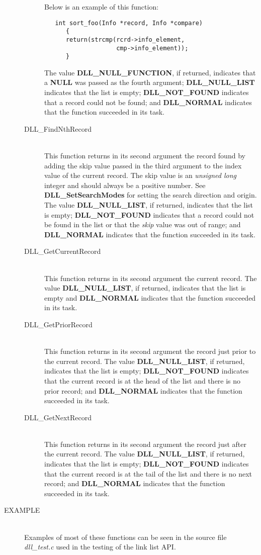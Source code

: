 \documentclass[10pt,letterpaper,titlepage]{article}
\begin{document}
\begin{description}
\begin{description}
 Below is an example of this function:

\begin{verbatim}
   int sort_foo(Info *record, Info *compare)
      {
      return(strcmp(rcrd->info_element,
                    cmp->info_element));
      }
\end{verbatim}

  The value \textbf{DLL\_NULL\_FUNCTION}, if returned, indicates that a \textbf{NULL} was passed as the fourth argument; \textbf{DLL\_NULL\_LIST} indicates that the list is empty; \textbf{DLL\_NOT\_FOUND} indicates that a record could not be found; and \textbf{DLL\_NORMAL} indicates that the function succeeded in its task.

\item[DLL\_FindNthRecord]\quad\\
 This function returns in its second argument the record found by adding the skip value passed in the third argument to the index value of the current record.  The skip value is an \emph{unsigned long} integer and should always be a positive number.  See \textbf{DLL\_SetSearchModes} for setting the search direction and origin.  The value \textbf{DLL\_NULL\_LIST}, if returned, indicates that the list is empty; \textbf{DLL\_NOT\_FOUND} indicates that a record could not be found in the list or that the \emph{skip} value was out of range; and \textbf{DLL\_NORMAL} indicates that the function succeeded in its task.

\item[DLL\_GetCurrentRecord]\quad\\
 This function returns in its second argument the current record.  The value \textbf{DLL\_NULL\_LIST}, if returned, indicates that the list is empty and \textbf{DLL\_NORMAL} indicates that the function succeeded in its task.

\item[DLL\_GetPriorRecord]\quad\\
 This function returns in its second argument the record just prior to the current record.  The value \textbf{DLL\_NULL\_LIST}, if returned, indicates that the list is empty; \textbf{DLL\_NOT\_FOUND} indicates that the current record is at the head of the list and there is no prior record; and \textbf{DLL\_NORMAL} indicates that the function succeeded in its task.

\item[DLL\_GetNextRecord]\quad\\
 This function returns in its second argument the record just after the current record.  The value \textbf{DLL\_NULL\_LIST}, if returned, indicates that the list is empty; \textbf{DLL\_NOT\_FOUND} indicates that the current record is at the tail of the list and there is no next record; and \textbf{DLL\_NORMAL} indicates that the function succeeded in its task.
\end{description}

\item[EXAMPLE]\quad\\
Examples of most of these functions can be seen in the source file \emph{dll\_test.c} used in the testing of the link list API.

\end{description}
\end{document}
